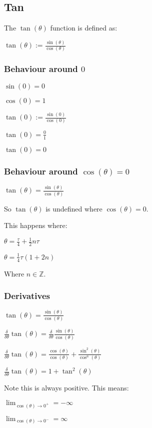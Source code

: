 
\subsection{Tan}


The \(\tan(\theta )\) function is defined as:

\(\tan(\theta ):=\frac{\sin(\theta )}{\cos(\theta )}\)

\subsubsection{Behaviour around \(0\)}

\(\sin(0)=0\)

\(\cos(0)=1\)

\(\tan(0):=\frac{\sin(0)}{\cos(0)}\)

\(\tan(0)=\frac{0}{1}\)

\(\tan(0)=0\)

\subsubsection{Behaviour around \(\cos(\theta )=0\)}

\(\tan(\theta )=\frac{\sin(\theta )}{\cos(\theta )}\)

So \(\tan (\theta )\) is undefined where \(\cos(\theta )=0\).

This happens where:

\(\theta=\frac{\tau }{4}+\frac{1}{2}n\tau \)

\(\theta=\frac{1}{4}\tau (1+2n)\)

Where \(n\in \mathbb{Z}\).

\subsubsection{Derivatives}

\(\tan(\theta )=\frac{\sin(\theta )}{\cos(\theta )}\)

\(\frac{\delta }{\delta \theta } \tan(\theta )=\frac{\delta }{\delta \theta }\frac{\sin(\theta )}{\cos(\theta )}\)

\(\frac{\delta }{\delta \theta } \tan(\theta )=\frac{\cos(\theta )}{\cos(\theta )}+ \frac{\sin^2(\theta )}{\cos^n(\theta )}\)

\(\frac{\delta }{\delta \theta } \tan(\theta )=1+\tan^2(\theta )\)

Note this is always positive. This means:

\(\lim_{\cos(\theta )\rightarrow 0^+}=-\infty\)

\(\lim_{\cos(\theta )\rightarrow 0^-}=\infty\)

